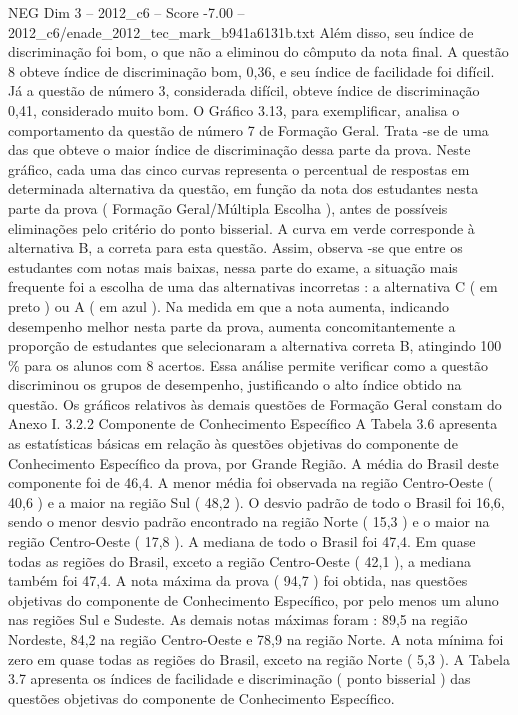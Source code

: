 \begin{textsample}{NEG Dim 3 – 2012\_c6 – Score -7.00 – 2012\_c6/enade\_2012\_tec\_mark\_b941a6131b.txt}
Além disso, seu índice de discriminação foi bom, o que não a eliminou do cômputo da nota final.
A questão 8 obteve índice de discriminação bom, 0,36, e seu índice de facilidade foi difícil.
Já a questão de número 3, considerada difícil, obteve índice de discriminação 0,41, considerado muito bom.
O Gráfico 3.13, para exemplificar, analisa o comportamento da questão de número 7 de Formação Geral.
Trata -se de uma das que obteve o maior índice de discriminação dessa parte da prova.
Neste gráfico, cada uma das cinco curvas representa o percentual de respostas em determinada alternativa da questão, em função da nota dos estudantes nesta parte da prova ( Formação Geral/Múltipla Escolha ), antes de possíveis eliminações pelo critério do ponto bisserial.
A curva em verde corresponde à alternativa B, a correta para esta questão.
Assim, observa -se que entre os estudantes com notas mais baixas, nessa parte do exame, a situação mais frequente foi a escolha de uma das alternativas incorretas : a alternativa C ( em preto ) ou A ( em azul ).
Na medida em que a nota aumenta, indicando desempenho melhor nesta parte da prova, aumenta concomitantemente a proporção de estudantes que selecionaram a alternativa correta B, atingindo 100 \% para os alunos com 8 acertos.
Essa análise permite verificar como a questão discriminou os grupos de desempenho, justificando o alto índice obtido na questão.
Os gráficos relativos às demais questões de Formação Geral constam do Anexo I. 3.2.2 Componente de Conhecimento Específico A Tabela 3.6 apresenta as estatísticas básicas em relação às questões objetivas do componente de Conhecimento Específico da prova, por Grande Região.
A média do Brasil deste componente foi de 46,4.
A menor média foi observada na região Centro-Oeste ( 40,6 ) e a maior na região Sul ( 48,2 ).
O desvio padrão de todo o Brasil foi 16,6, sendo o menor desvio padrão encontrado na região Norte ( 15,3 ) e o maior na região Centro-Oeste ( 17,8 ).
A mediana de todo o Brasil foi 47,4.
Em quase todas as regiões do Brasil, exceto a região Centro-Oeste ( 42,1 ), a mediana também foi 47,4.
A nota máxima da prova ( 94,7 ) foi obtida, nas questões objetivas do componente de Conhecimento Específico, por pelo menos um aluno nas regiões Sul e Sudeste.
As demais notas máximas foram : 89,5 na região Nordeste, 84,2 na região Centro-Oeste e 78,9 na região Norte.
A nota mínima foi zero em quase todas as regiões do Brasil, exceto na região Norte ( 5,3 ).
A Tabela 3.7 apresenta os índices de facilidade e discriminação ( ponto bisserial ) das questões objetivas do componente de Conhecimento Específico.

\end{textsample}
